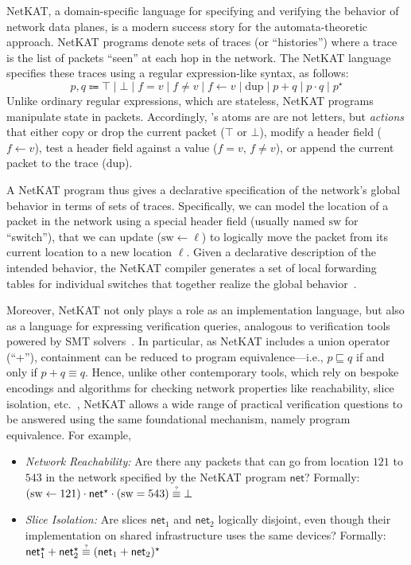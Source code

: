 \documentclass[acmsmall,dvipsnames,nonacm]{acmart}
\begin{document}
NetKAT, a domain-specific language for specifying and verifying the
behavior of network data planes, is a modern success story for the
automata-theoretic approach.  NetKAT programs denote sets of traces
(or ``histories'') where a trace is the list of packets ``seen'' at
each hop in the network. The NetKAT language specifies these traces
using a regular expression-like syntax, as follows:
%
\[
  p,q \Coloneqq \top \mid \bot \mid f = v \mid f \neq v \mid f \gets v \mid \text{dup} \mid p + q \mid p \cdot q \mid p^\star
\]
%
Unlike ordinary regular expressions, which are stateless,
NetKAT programs manipulate state in packets. Accordingly, \NetKAT's
atoms are are not letters, but \emph{actions} that either copy or drop
the current packet ($\top$ or $\bot$), modify a header field ($f \gets
v$), test a header field against a value ($f = v$, $f \neq v$), or
append the current packet to the trace ($\text{dup}$).

A NetKAT program thus gives a declarative specification of the
network's global behavior in terms of sets of traces. Specifically, we
can model the location of a packet in the network using a special
header field (usually named $\text{sw}$ for ``switch''), that we can
update ($\text{sw} \gets \ell$) to logically move the packet from its current
location to a new location $\ell$. Given a declarative description of the
intended behavior, the NetKAT compiler generates a set of local
forwarding tables for individual switches that together realize the
global behavior~\cite{Foster2011,Smolka2015}.

Moreover, NetKAT not only plays a role as an implementation language,
but also as a language for expressing verification queries, analogous
to verification tools powered by SMT
solvers~\cite{Leino2014,Barnett2005,Torlak2013}. In particular, as NetKAT includes
a union operator (``+''), containment can be reduced to program
equivalence---i.e., $p \sqsubseteq q$ if and only if $p + q \equiv
q$. Hence, unlike other contemporary tools, which rely on bespoke
encodings and algorithms for checking network properties like
reachability, slice isolation, etc.~\cite{Kazemian2012,Khurshid2012,Yang2016,Fogel2015},
NetKAT allows a wide range of practical verification questions to be
answered using the same foundational mechanism, namely program
equivalence. For example,

\begin{itemize}
    \item{\textit{Network Reachability:}} Are there any packets that
      can go from location $121$ to $543$ in the network specified by the NetKAT program
      $\textsf{net}$? Formally: $(\text{sw} \gets 121) \cdot \textsf{net}^\star
      \cdot (\text{sw} = 543) \mathrel{\accentset{?}{\equiv}} \bot$
  \item{\textit{Slice Isolation:}} Are slices $\textsf{net}_1$ and
    $\textsf{net}_2$ logically disjoint, even though their
    implementation on shared infrastructure uses the same devices? Formally:
    $\textsf{net}_1^\star + \textsf{net}_2^\star \mathrel{\accentset{?}{\equiv}} (\textsf{net}_1 + \textsf{net}_2)^\star$
\end{itemize}
\end{document}
